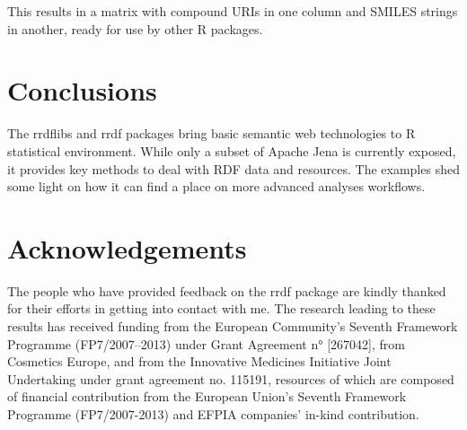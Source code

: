 \documentclass[12pt]{article}
\begin{document}
This results in a matrix with compound URIs in one column and SMILES strings in another, ready for
use by other R packages.

\section{Conclusions}

The rrdflibs and rrdf packages bring basic semantic web technologies to R statistical environment.
While only a subset of Apache Jena is currently exposed, it provides key methods to deal with
RDF data and resources. The examples shed some light on how it can find a place on more advanced
analyses workflows.

\section{Acknowledgements}

The people who have provided feedback on the rrdf package are kindly thanked for their efforts in
getting into contact with me.
The research leading to these results has received funding from the European Community’s Seventh
Framework Programme (FP7/2007–2013) under Grant Agreement n° [267042], from Cosmetics Europe, 
and from the Innovative Medicines Initiative Joint Undertaking under grant agreement no. 115191,
resources of which are composed of financial contribution from the European Union's Seventh Framework
Programme (FP7/2007-2013) and EFPIA companies’ in-kind contribution.

\printbibliography
\end{document}

